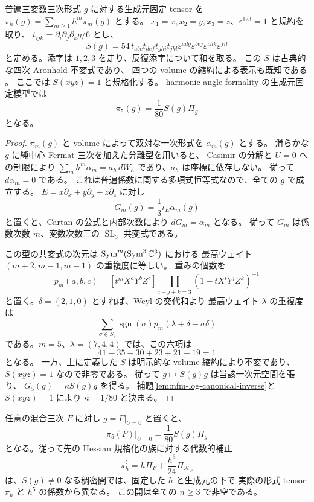 \begin{proposition}
\label{prop:nfm-active-fifth-covariant}
普遍三変数三次形式 $g$ に対する生成元固定 tensor を
$\pi_h(g)=\sum_{m\ge1}h^m\pi_m(g)$ とする。
$x_1=x,x_2=y,x_3=z$、$\varepsilon^{123}=1$ と規約を取り、
$t_{ijk}=\partial_i\partial_j\partial_k g/6$ とし、
\[
 S(g)=54\,t_{abc}t_{def}t_{ghi}t_{jkl}
             \varepsilon^{adg}\varepsilon^{bej}
             \varepsilon^{chk}\varepsilon^{fil}
\]
と定める。添字は $1,2,3$ を走り、反復添字について和を取る。
この $S$ は古典的な四次 Aronhold 不変式であり、
四つの volume の縮約による表示も既知である
\cite[Section~3, after Remark~3.3]{NFMOttavianiAronhold}。
ここでは $S(xyz)=1$ と規格化する。
harmonic-angle formality の生成元固定模型では
\[
 \pi_5(g)=\frac1{80}S(g)\Pi_g
\]
となる。
\end{proposition}

\begin{proof}
$\pi_m(g)$ と volume によって双対な一次形式を $\alpha_m(g)$ とする。
滑らかな $g$ に純中心 Fermat 三次を加えた分離型を用いると、
Casimir の分解と $U=0$ への制限により
$\sum_m h^m\alpha_m=a_h\,dW_h$ であり、$a_h$ は座標に依存しない。
従って $d\alpha_m=0$ である。
これは普遍係数に関する多項式恒等式なので、全ての $g$ で成立する。
$E=x\partial_x+y\partial_y+z\partial_z$ に対し
\[
 G_m(g)=\frac13\iota_E\alpha_m(g)
\]
と置くと、Cartan の公式と内部次数により $dG_m=\alpha_m$ となる。
従って $G_m$ は係数次数 $m$、変数次数三の
$\operatorname{SL}_3$ 共変式である。

この型の共変式の次元は
$\operatorname{Sym}^m(\operatorname{Sym}^3\mathbb C^3)$ における
最高ウェイト $(m+2,m-1,m-1)$ の重複度に等しい。
重みの個数を
\[
 p_m(a,b,c)=[t^mX^aY^bZ^c]
     \prod_{i+j+k=3}(1-tX^iY^jZ^k)^{-1}
\]
と置く。$\delta=(2,1,0)$ とすれば、Weyl の交代和より
最高ウェイト $\lambda$ の重複度は
\[
 \sum_{\sigma\in S_3}\operatorname{sgn}(\sigma)
             p_m(\lambda+\delta-\sigma\delta)
\]
である。$m=5$、$\lambda=(7,4,4)$ では、この六項は
\[
 41-35-30+23+21-19=1
\]
となる。
一方、上に定義した $S$ は明示的な volume 縮約により不変であり、
$S(xyz)=1$ なので非零である。
従って $g\mapsto S(g)g$ は当該一次元空間を張り、
$G_5(g)=\kappa S(g)g$ を得る。
補題\ref{lem:nfm-log-canonical-inverse}と $S(xyz)=1$ により
$\kappa=1/80$ と決まる。
\end{proof}

\begin{corollary}
\label{cor:nfm-fifth-restriction-obstruction}
任意の混合三次 $F$ に対し $g=F|_{U=0}$ と置くと、
\[
 \pi_5(F)|_{U=0}=\frac1{80}S(g)\Pi_g
\]
となる。従って先の Hessian 規格化の族に対する代数的補正
\[
 \pi_h^\sharp=h\Pi_F+\frac{h^3}{24}\Pi_{\mathscr H_F}
\]
は、$S(g)\ne0$ なる稠密開では、固定した $h$ と生成元の下で
実際の形式 tensor $\pi_h$ と $h^5$ の係数から異なる。
この開は全ての $n\ge3$ で非空である。
\end{corollary}

